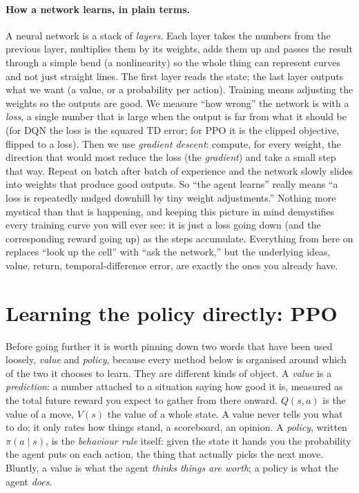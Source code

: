 \documentclass[11pt]{article}
\newcommand{\key}[1]{\textit{#1}}            %
\begin{document}
\paragraph{How a network learns, in plain terms.} A neural network is a stack of
\key{layers}. Each layer takes the numbers from the previous layer, multiplies them by its
weights, adds them up and passes the result through a simple bend (a nonlinearity) so the
whole thing can represent curves and not just straight lines. The first layer reads the
state; the last layer outputs what we want (a value, or a probability per action). Training
means adjusting the weights so the outputs are good. We measure ``how wrong'' the network
is with a \key{loss}, a single number that is large when the output is far from what it
should be (for DQN the loss is the squared TD error; for PPO it is the clipped objective,
flipped to a loss). Then we use \key{gradient descent}: compute, for every weight, the
direction that would most reduce the loss (the \key{gradient}) and take a small step that
way. Repeat on batch after batch of experience and the network slowly slides into weights
that produce good outputs. So ``the agent learns'' really means ``a loss is repeatedly
nudged downhill by tiny weight adjustments.'' Nothing more mystical than that is happening,
and keeping this picture in mind demystifies every training curve you will ever see: it is
just a loss going down (and the corresponding reward going up) as the steps accumulate. Everything from here
on replaces ``look up the cell'' with ``ask the network,'' but the underlying ideas, value,
return, temporal-difference error, are exactly the ones you already have.

\section{Learning the policy directly: PPO}

Before going further it is worth pinning down two words that have been used loosely,
\emph{value} and \emph{policy}, because every method below is organised around which of the
two it chooses to learn. They are different kinds of object. A \key{value} is a
\emph{prediction}: a number attached to a situation saying how good it is, measured as the
total future reward you expect to gather from there onward. $Q(s,a)$ is the value of a move,
$V(s)$ the value of a whole state. A value never tells you what to do; it only rates how
things stand, a scoreboard, an opinion. A \key{policy}, written $\pi(a\mid s)$, is the
\emph{behaviour rule} itself: given the state it hands you the probability the agent puts on
each action, the thing that actually picks the next move. Bluntly, a value is what the agent
\emph{thinks things are worth}; a policy is what the agent \emph{does}.
\end{document}
